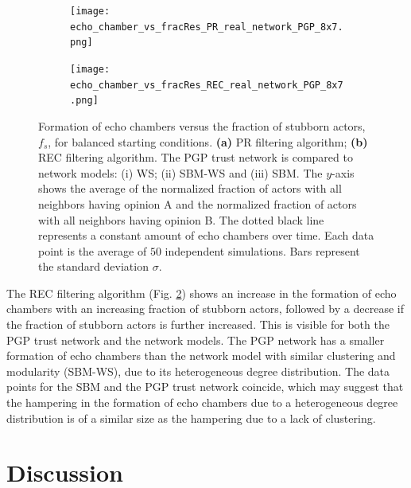 \documentclass[11 pt , letterpaper , twoside , openright]{book}
\begin{document}
\begin{figure}[H]
  \begin{subfigure}[b]{0.49\textwidth}
    \caption{}
  	\texttt{[image: echo\_chamber\_vs\_fracRes\_PR\_real\_network\_PGP\_8x7.png]}
    \label{pr_real_PGP}
  \end{subfigure}
  \begin{subfigure}[b]{0.49\textwidth}
    \caption{}
  	\texttt{[image: echo\_chamber\_vs\_fracRes\_REC\_real\_network\_PGP\_8x7.png]}
    \label{rec_real_PGP}
  \end{subfigure}
  \captionsetup{format=plain}
  \caption[Formation of echo chambers versus fraction of stubborn actors for balanced starting conditions. The PR and REC filtering algorithms are compared. The PGP trust network is compared to corresponding network models.]{Formation of echo chambers versus the fraction of stubborn actors, $f_s$, for balanced starting conditions. \textbf{(a)} PR filtering algorithm; \textbf{(b)} REC filtering algorithm. The PGP trust network is compared to network models: (i) WS; (ii) SBM-WS and (iii) SBM. The $y$-axis shows the average of the normalized fraction of actors with all neighbors having opinion A and the normalized fraction of actors with all neighbors having opinion B. The dotted black line represents a constant amount of echo chambers over time. Each data point is the average of $50$ independent simulations. Bars represent the standard deviation $\sigma$.}
\label{echo_vs_fracRes_real_PGP}
\end{figure}
\newpage
\noindent
The REC filtering algorithm (Fig. \ref{rec_real_PGP}) shows an increase in the formation of echo chambers with an increasing fraction of stubborn actors, followed by a decrease if the fraction of stubborn actors is further increased. This is visible for both the PGP trust network and the network models. The PGP network has a smaller formation of echo chambers than the network model with similar clustering and modularity (SBM-WS), due to its heterogeneous degree distribution. The data points for the SBM and the PGP trust network coincide, which may suggest that the hampering in the formation of echo chambers due to a heterogeneous degree distribution is of a similar size as the hampering due to a lack of clustering.

\chapter{Discussion}
\end{document}
